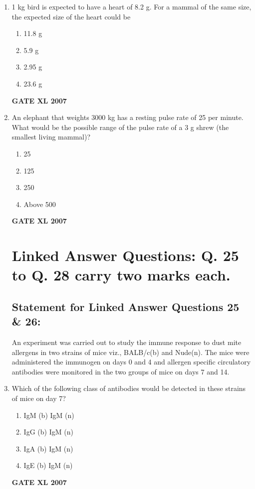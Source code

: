 \documentclass[journal,12pt,onecolumn]{IEEEtran}
\begin{document}
\begin{enumerate}
\item 1 kg bird is expected to have a heart of 8.2 g. For a mammal of the same size, the expected size of the heart could be
\begin{enumerate}
    \item 11.8 g
    \item 5.9 g
    \item 2.95 g
    \item 23.6 g
\end{enumerate}\hfill{\textbf{GATE XL 2007}}

\item An elephant that weights 3000 kg has a resting pulse rate of 25 per minute. What would be the possible range of the pulse rate of a 3 g shrew (the smallest living mammal)?
\begin{enumerate}
    \item 25
    \item 125
    \item 250
    \item Above 500
\end{enumerate}\hfill{\textbf{GATE XL 2007}}

\vspace{2em}

\section*{Linked Answer Questions: Q. 25 to Q. 28 carry two marks each.}

\subsection*{Statement for Linked Answer Questions 25 \& 26:}
An experiment was carried out to study the immune response to dust mite allergens in two strains of mice viz., BALB/c(b) and Nude(n). The mice were administered the immunogen on days 0 and 4 and allergen specific circulatory antibodies were monitored in the two groups of mice on days 7 and 14.

\item Which of the following class of antibodies would be detected in these strains of mice on day 7?
\begin{enumerate}
    \item IgM (b) IgM (n)
    \item IgG (b) IgM (n)
    \item IgA (b) IgM (n)
    \item IgE (b) IgM (n)
\end{enumerate}\hfill{\textbf{GATE XL 2007}}


\end{enumerate}
\end{document}

